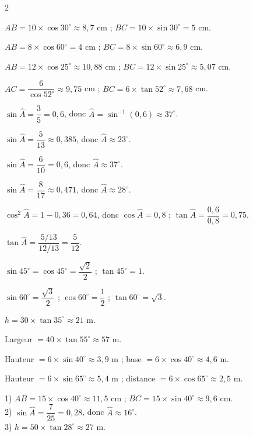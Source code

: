 \begin{multicols}{2}

$AB=10\times\cos30^{\circ}\approx8{,}7$ cm ; $BC=10\times\sin30^{\circ}=5$ cm.

$AB=8\times\cos60^{\circ}=4$ cm ; $BC=8\times\sin60^{\circ}\approx6{,}9$ cm.

$AB=12\times\cos25^{\circ}\approx10{,}88$ cm ; $BC=12\times\sin25^{\circ}\approx5{,}07$ cm.

$AC=\dfrac6{\cos52^{\circ}}\approx9{,}75$ cm ; $BC=6\times\tan52^{\circ}\approx7{,}68$ cm.

$\sin\widehat A=\dfrac35=0{,}6$, donc $\widehat A=\sin^{-1}(0{,}6)\approx37^{\circ}$.

$\sin\widehat A=\dfrac5{13}\approx0{,}385$, donc $\widehat A\approx23^{\circ}$.

$\sin\widehat A=\dfrac6{10}=0{,}6$, donc $\widehat A\approx37^{\circ}$.

$\sin\widehat A=\dfrac8{17}\approx0{,}471$, donc $\widehat A\approx28^{\circ}$.

$\cos^{2}\widehat A=1-0{,}36=0{,}64$, donc $\cos\widehat A=0{,}8$ ;
$\tan\widehat A=\dfrac{0{,}6}{0{,}8}=0{,}75$.

$\tan\widehat A=\dfrac{5/13}{12/13}=\dfrac5{12}$.

$\sin45^{\circ}=\cos45^{\circ}=\dfrac{\sqrt2}2$ ; $\tan45^{\circ}=1$.

$\sin60^{\circ}=\dfrac{\sqrt3}2$ ; $\cos60^{\circ}=\dfrac12$ ; $\tan60^{\circ}=\sqrt3$.

$h=30\times\tan35^{\circ}\approx21$ m.

Largeur $=40\times\tan55^{\circ}\approx57$ m.

Hauteur $=6\times\sin40^{\circ}\approx3{,}9$ m ; base $=6\times\cos40^{\circ}\approx4{,}6$ m.

Hauteur $=6\times\sin65^{\circ}\approx5{,}4$ m ; distance $=6\times\cos65^{\circ}\approx2{,}5$ m.

1) $AB=15\times\cos40^{\circ}\approx11{,}5$ cm ; $BC=15\times\sin40^{\circ}\approx9{,}6$
cm.\\
2) $\sin\widehat A=\dfrac7{25}=0{,}28$, donc $\widehat A\approx16^{\circ}$.\\
3) $h=50\times\tan28^{\circ}\approx27$ m.


\end{multicols}
